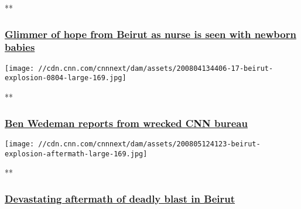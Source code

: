 **

\hypertarget{glimmer-of-hope-from-beirut-as-nurse-is-seen-with-newborn-babies-}{%
\subsubsection{\texorpdfstring{\href{/videos/world/2020/08/05/lebanon-beirut-explosion-blast-nurse-three-babies-picture-ctw-intl-ldn-vpx.cnn/video/playlists/beirut-explosion/}{Glimmer
of hope from Beirut as nurse is seen with newborn babies
}}{Glimmer of hope from Beirut as nurse is seen with newborn babies }}\label{glimmer-of-hope-from-beirut-as-nurse-is-seen-with-newborn-babies-}}

\href{/videos/world/2020/08/04/beirut-lebanon-explosion-ben-wedeman-live-amanpour-vpx.cnn/video/playlists/beirut-explosion/}{}

\texttt{[image: //cdn.cnn.com/cnnnext/dam/assets/200804134406-17-beirut-explosion-0804-large-169.jpg]}

**

\hypertarget{ben-wedeman-reports-from-wrecked-cnn-bureau}{%
\subsubsection{\texorpdfstring{\href{/videos/world/2020/08/04/beirut-lebanon-explosion-ben-wedeman-live-amanpour-vpx.cnn/video/playlists/beirut-explosion/}{Ben
Wedeman reports from wrecked CNN
bureau}}{Ben Wedeman reports from wrecked CNN bureau}}\label{ben-wedeman-reports-from-wrecked-cnn-bureau}}

\href{/videos/world/2020/08/05/lebanon-beirut-explosion-wedeman-pkg-intl-hnk-vpx.cnn/video/playlists/beirut-explosion/}{}

\texttt{[image: //cdn.cnn.com/cnnnext/dam/assets/200805124123-beirut-explosion-aftermath-large-169.jpg]}

**

\hypertarget{devastating-aftermath-of-deadly-blast-in-beirut-}{%
\subsubsection{\texorpdfstring{\href{/videos/world/2020/08/05/lebanon-beirut-explosion-wedeman-pkg-intl-hnk-vpx.cnn/video/playlists/beirut-explosion/}{Devastating
aftermath of deadly blast in Beirut
}}{Devastating aftermath of deadly blast in Beirut }}\label{devastating-aftermath-of-deadly-blast-in-beirut-}}

\href{/videos/world/2020/08/04/beirut-lebanon-explosion-intl-ldn-vpx.cnn/video/playlists/beirut-explosion/}{}

